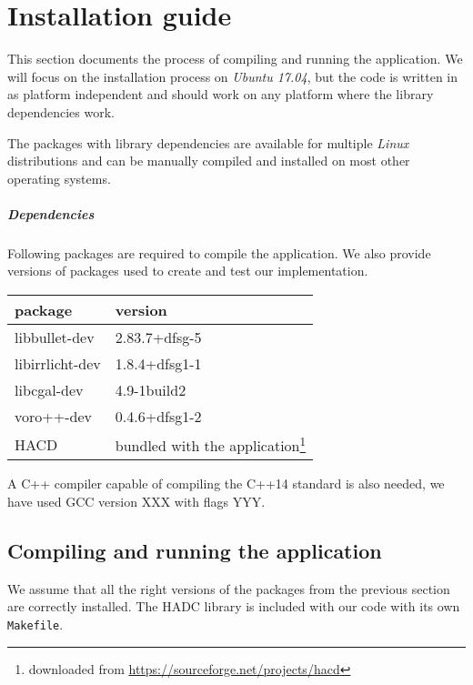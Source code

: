 \chapter{Installation guide}

This section documents the process of compiling and running the application. We will focus on the installation process on \emph{Ubuntu 17.04}, but the code is written in as platform independent and should work on any platform where the library dependencies work.

The packages with library dependencies are available for multiple \emph{Linux}
distributions and can be manually compiled and installed on most other
operating systems.

\paragraph{Dependencies}
Following packages are required to compile the application. We also provide versions of packages used to create and test our implementation.
\begin{center}
\begin{tabular}{ll}
package & version \\
\hline
libbullet-dev & 2.83.7+dfsg-5 \\
libirrlicht-dev & 1.8.4+dfsg1-1 \\
libcgal-dev & 4.9-1build2 \\
voro++-dev & 0.4.6+dfsg1-2 \\
HACD & bundled with the application\footnote{downloaded from \url{https://sourceforge.net/projects/hacd}}
\end{tabular}
\end{center}

A C++ compiler capable of compiling the C++14 standard is also needed, we have used GCC version XXX with flags YYY.

\section{Compiling and running the application}
We assume that all the right versions of the packages from the previous section are correctly installed. The HADC library is included with our code with its own {\tt Makefile}.

